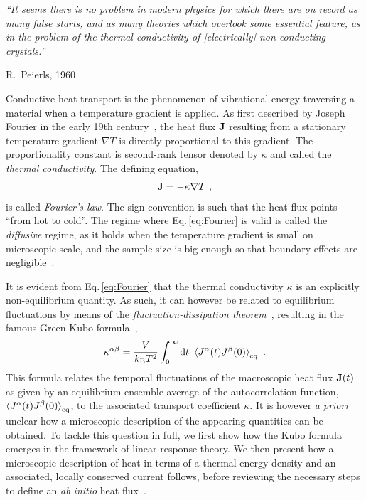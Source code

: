 \epigraph{\singlespacing \it ``It seems there is no problem in modern physics for which there are on record as many false starts, and as many theories which overlook some essential feature, as in the problem of the thermal conductivity of [electrically] non-conducting crystals.''}{R.~Peierls, 1960}


Conductive heat transport is the phenomenon of vibrational energy traversing a material when a temperature gradient is applied. As first described by Joseph Fourier in the early 19th century~\cite{Fourier1878}, the heat flux ${\bf J}$ resulting from a stationary temperature gradient $\nabla T$ is directly proportional to this gradient. The proportionality constant is second-rank tensor denoted by $\kappa$ and called the \emph{thermal conductivity}. The defining equation,
\begin{align}
  \b J = - \kappa \nabla T~,
  \label{eq:Fourier}
\end{align}
is called \emph{Fourier's law}. The sign convention is such that the heat flux points ``from hot to cold''. The regime where Eq.\,\eqref{eq:Fourier} is valid is called the \emph{diffusive} regime, as it holds when the temperature gradient is small on microscopic scale, and the sample size is big enough so that boundary effects are negligible~\cite{Kapitza1941a,Antidormi2020}.

It is evident from Eq.\,\eqref{eq:Fourier} that the thermal conductivity $\kappa$ is an explicitly non-equilibrium quantity. As such, it can however be related to equilibrium fluctuations by means of the \emph{fluctuation-dissipation theorem}~\cite{Einstein1905a,Nyquist1928,Callen1951,Kubo1957a}, resulting in the famous Green-Kubo formula~\cite{Green1952,Kubo1957b},
\begin{align}
  \kappa^{\alpha \beta} = \frac{V}{k_{\rm B} T^2} \int_{0}^{\infty} \d t ~
    \braket{J^\alpha (t) J^\beta(0)}_{\rm eq}~.
  \label{eq:GreenKubo}
\end{align}
This formula relates the temporal fluctuations of the macroscopic heat flux ${\bf J} (t)$ as given by an equilibrium ensemble average of the autocorrelation function, $\braket{J^\alpha (t) J^\beta(0)}_{\rm eq}$, to the associated transport coefficient $\kappa$. It is however \emph{a priori} unclear how a microscopic description of the appearing quantities can be obtained. To tackle this question in full, we first show how the Kubo formula emerges in the framework of linear response theory. We then present how a microscopic description of heat in terms of a thermal energy density and an associated, locally conserved current follows, before reviewing the necessary steps to define an \emph{ab initio} heat flux~\cite{Carbogno2016}.

